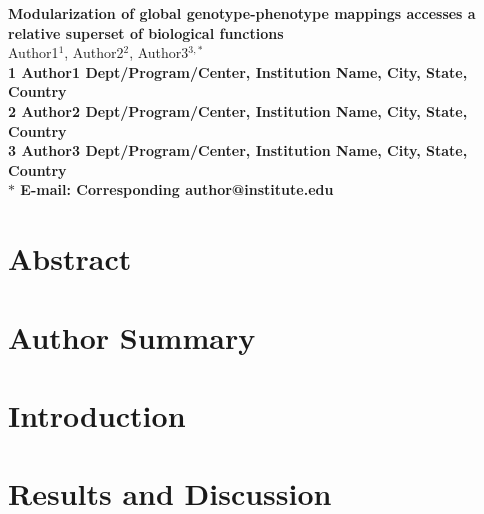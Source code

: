 



\begin{flushleft}
{\Large
\textbf{Modularization of global genotype-phenotype mappings accesses a relative superset of biological functions}
}
\\
Author1$^{1}$,
Author2$^{2}$,
Author3$^{3,\ast}$
\\
\bf{1} Author1 Dept/Program/Center, Institution Name, City, State, Country
\\
\bf{2} Author2 Dept/Program/Center, Institution Name, City, State, Country
\\
\bf{3} Author3 Dept/Program/Center, Institution Name, City, State, Country
\\
$\ast$ E-mail: Corresponding author@institute.edu
\end{flushleft}

\section*{Abstract}


\section*{Author Summary}


\section*{Introduction}


\section*{Results and Discussion}
